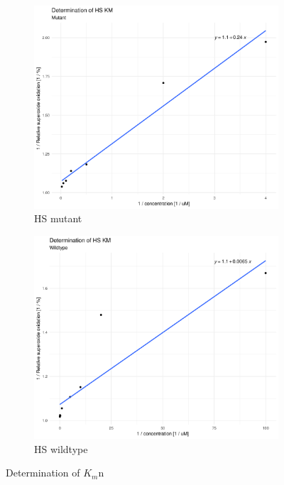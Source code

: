 \begin{figure}
    \centering
    \begin{subfigure}{0.9\textwidth}
	\includegraphics[width=\textwidth]{img/activity_mut_km_lb.png}
	\caption{HS mutant}
	\label{fig:activity_mut_km_lb}
    \end{subfigure}

    \begin{subfigure}{0.9\textwidth}
	\includegraphics[width=\textwidth]{img/activity_wt_km_lb.png}
	\caption{HS wildtype}
	\label{fig:activity_wt_km_lb}
    \end{subfigure}
    \caption{Determination of $K_m$n}
    \label{fig:activity_km_lb}
\end{figure}

